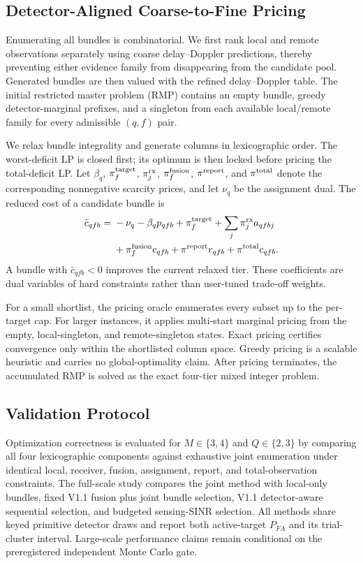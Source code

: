 \subsection{Detector-Aligned Coarse-to-Fine Pricing}
Enumerating all bundles is combinatorial.  We first rank local and remote
observations separately using coarse delay--Doppler predictions, thereby
preventing either evidence family from disappearing from the candidate pool.
Generated bundles are then valued with the refined delay--Doppler table.  The
initial restricted master problem (RMP) contains an empty bundle, greedy
detector-marginal prefixes, and a singleton from each available local/remote
family for every admissible $(q,f)$ pair.

We relax bundle integrality and generate columns in lexicographic order.  The
worst-deficit LP is closed first; its optimum is then locked before pricing the
total-deficit LP.  Let $\beta_q$, $\pi_f^{\rm target}$,
$\pi_j^{\rm rx}$, $\pi_f^{\rm fusion}$, $\pi^{\rm report}$, and
$\pi^{\rm total}$ denote the corresponding nonnegative scarcity prices, and
let $\nu_q$ be the assignment dual.  The reduced cost of a candidate bundle is
\begin{align}
\bar c_{qfb}={}&-\nu_q-\beta_qp_{qfb}+\pi_f^{\rm target}
+\sum_j\pi_j^{\rm rx}a_{qfbj}\nonumber\\
&+\pi_f^{\rm fusion}c_{qfb}+\pi^{\rm report}r_{qfb}
+\pi^{\rm total}c_{qfb}.
\label{eq:v12-reduced-cost}
\end{align}
A bundle with $\bar c_{qfb}<0$ improves the current relaxed tier.  These
coefficients are dual variables of hard constraints rather than user-tuned
trade-off weights.

For a small shortlist, the pricing oracle enumerates every subset up to the
per-target cap.  For larger instances, it applies multi-start marginal pricing
from the empty, local-singleton, and remote-singleton states.  Exact pricing
certifies convergence only within the shortlisted column space.  Greedy
pricing is a scalable heuristic and carries no global-optimality claim.  After
pricing terminates, the accumulated RMP is solved as the exact four-tier mixed
integer problem.

\subsection{Validation Protocol}
Optimization correctness is evaluated for $M\in\{3,4\}$ and
$Q\in\{2,3\}$ by comparing all four lexicographic components against exhaustive
joint enumeration under identical local, receiver, fusion, assignment,
report, and total-observation constraints.  The full-scale study compares the
joint method with local-only bundles, fixed V1.1 fusion plus joint bundle
selection, V1.1 detector-aware sequential selection, and budgeted sensing-SINR
selection.  All methods share keyed primitive detector draws and report both
active-target $P_{FA}$ and its trial-cluster interval.  Large-scale performance
claims remain conditional on the preregistered independent Monte Carlo gate.
